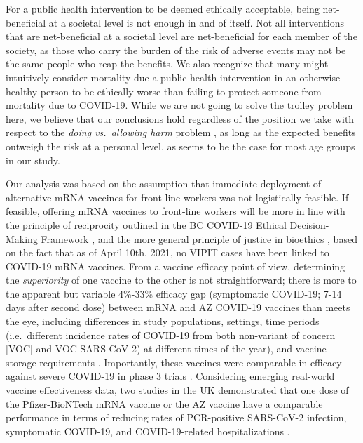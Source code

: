 \documentclass[]{interact}
\theoremstyle{plain}%
\theoremstyle{definition}
\theoremstyle{remark}
\begin{document}
For a public health intervention to be deemed ethically acceptable,
being net-beneficial at a societal level is not enough in and of itself.
Not all interventions that are net-beneficial at a societal level are
net-beneficial for each member of the society, as those who carry the
burden of the risk of adverse events may not be the same people who reap
the benefits. We also recognize that many might intuitively consider
mortality due a public health intervention in an otherwise healthy
person to be ethically worse than failing to protect someone from
mortality due to COVID-19. While we are not going to solve the trolley
problem here, we believe that our conclusions hold regardless of the
position we take with respect to the \emph{doing vs.~allowing harm}
problem \citep{woollard_doing_2016}, as long as the expected benefits
outweigh the risk at a personal level, as seems to be the case for most
age groups in our study.

Our analysis was based on the assumption that immediate deployment of
alternative mRNA vaccines for front-line workers was not logistically
feasible. If feasible, offering mRNA vaccines to front-line workers will
be more in line with the principle of reciprocity outlined in the BC
COVID-19 Ethical Decision-Making Framework \citep{bccdc_covid-19_2020},
and the more general principle of justice in bioethics
\citep{mccormick_principles_2021}, based on the fact that as of April
10th, 2021, no VIPIT cases have been linked to COVID-19 mRNA vaccines.
From a vaccine efficacy point of view, determining the
\emph{superiority} of one vaccine to the other is not straightforward;
there is more to the apparent but variable 4\%-33\% efficacy gap
(symptomatic COVID-19; 7-14 days after second dose) between mRNA and AZ
COVID-19 vaccines
\citep{polack_safety_2020, baden_efficacy_2021, astrazeneca_azd1222_2021, emary_efficacy_2021}
than meets the eye, including differences in study populations,
settings, time periods (i.e.~different incidence rates of COVID-19 from
both non-variant of concern {[}VOC{]} and VOC SARS-CoV-2) at different
times of the year), and vaccine storage requirements
\citep{ledford_why_2021}. Importantly, these vaccines were comparable in
efficacy against severe COVID-19 in phase 3 trials
\citep{abdool_karim_new_2021, astrazeneca_azd1222_2021}. Considering
emerging real-world vaccine effectiveness data, two studies in the UK
demonstrated that one dose of the Pfizer-BioNTech mRNA vaccine or the AZ
vaccine have a comparable performance in terms of reducing rates of
PCR-positive SARS-CoV-2 infection, symptomatic COVID-19, and
COVID-19-related hospitalizations
\citep{shrotri_vaccine_2021, jamie_lopez_bernal_early_2021}.
\end{document}
